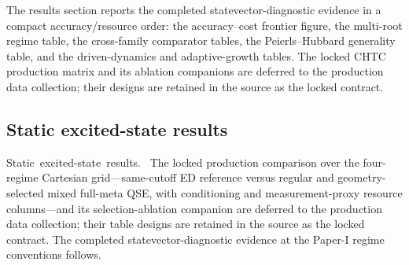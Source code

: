 \documentclass[
  reprint,
  amsmath,
  amssymb,
  aps,
  pra,
  nofootinbib,
  superscriptaddress,
  floatfix
]{revtex4-2}
\newcommand{\tentative}[1]{\textcolor{red!70!black}{#1}}
\newcommand{\structlabel}[1]{\noindent\mbox{\tentative{#1.}}~}
\begin{document}
%
%

The results section reports the completed statevector-diagnostic evidence in a compact accuracy/resource order: the accuracy--cost frontier figure, the multi-root regime table, the cross-family comparator tables, the Peierls--Hubbard generality table, and the driven-dynamics and adaptive-growth tables.  The locked CHTC production matrix and its ablation companions are deferred to the production data collection; their designs are retained in the source as the locked contract.

\subsection{Static excited-state results}

\structlabel{Static excited-state results}
The locked production comparison over the four-regime Cartesian grid---same-cutoff ED reference versus regular and geometry-selected mixed full-meta QSE, with conditioning and measurement-proxy resource columns---and its selection-ablation companion are deferred to the production data collection; their table designs are retained in the source as the locked contract.  The completed statevector-diagnostic evidence at the Paper-I regime conventions follows.
\end{document}
